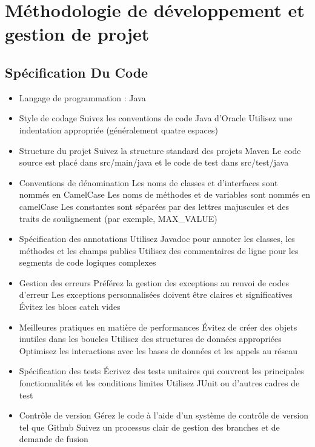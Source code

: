 \documentclass{article}
\begin{document}
\section{Méthodologie de développement et gestion de projet}
\subsection{Spécification Du Code}
\begin{itemize}
    \item Langage de programmation : Java
    \item Style de codage 
    \subitem Suivez les conventions de code Java d'Oracle
    \subitem Utilisez une indentation appropriée (généralement quatre espaces)
    \item Structure du projet
    \subitem Suivez la structure standard des projets Maven
    \subitem Le code source est placé dans src/main/java et le code de test dans src/test/java
    \item Conventions de dénomination
    \subitem Les noms de classes et d'interfaces sont nommés en CamelCase
    \subitem Les noms de méthodes et de variables sont nommés en camelCase
    \subitem Les constantes sont séparées par des lettres majuscules et des traits de soulignement (par exemple, MAX\_VALUE)
    \item Spécification des annotations
    \subitem Utilisez Javadoc pour annoter les classes, les méthodes et les champs publics
    \subitem Utilisez des commentaires de ligne pour les segments de code logiques complexes
    \item Gestion des erreurs
    \subitem Préférez la gestion des exceptions au renvoi de codes d'erreur
    \subitem Les exceptions personnalisées doivent être claires et significatives
    \subitem Évitez les blocs catch vides
    \item Meilleures pratiques en matière de performances
    \subitem Évitez de créer des objets inutiles dans les boucles
    \subitem Utilisez des structures de données appropriées
    \subitem Optimisez les interactions avec les bases de données et les appels au réseau
    \item Spécification des tests
    \subitem Écrivez des tests unitaires qui couvrent les principales fonctionnalités et les conditions limites
    \subitem Utilisez JUnit ou d'autres cadres de test
    \item Contrôle de version
    \subitem Gérez le code à l'aide d'un système de contrôle de version tel que Github
    \subitem Suivez un processus clair de gestion des branches et de demande de fusion
\end{itemize}
\end{document}
